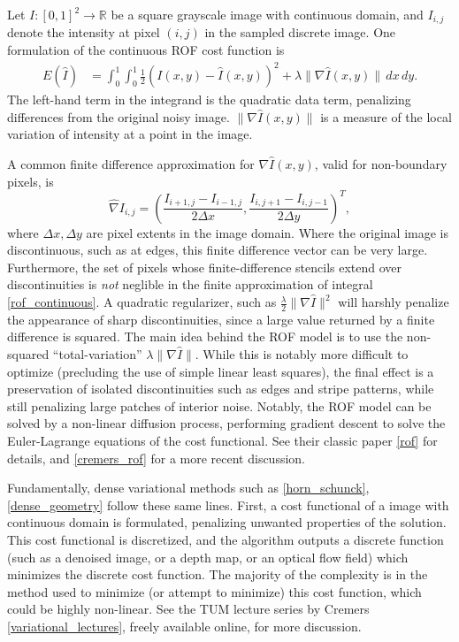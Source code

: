 \documentclass[conference]{IEEEtran}
\begin{document}
Let $I:[0,1]^2 \rightarrow \mathbb{R}$ be a square grayscale image with continuous domain, and
$I_{i,j}$ denote the intensity at pixel $(i, j)$ in the sampled discrete image.
One formulation of the continuous ROF cost function is
\begin{equation}\label{rof_continuous}
\begin{split}
    E(\hat{I}) &= \int_0^1\int_0^1 \frac{1}{2} \left(I(x,y) - \hat{I}(x,y)\right)^2 + \lambda \|\nabla \hat{I}(x,y)\| \,dx \,dy.
\end{split}
\end{equation}
The left-hand term in the integrand is the quadratic data term, penalizing differences from the original noisy image.
$\|\nabla \hat{I}(x,y)\|$ is a measure of the local variation of intensity at a point in the image.

A common finite difference approximation for $\nabla\hat{I}(x,y)$, valid for non-boundary pixels, is
\begin{equation}
    \hat{\nabla}I_{i,j} = \left(\frac{I_{i+1,j} - I_{i-1,j}}{2\Delta x}, \frac{I_{i,j+1} - I_{i,j-1}}{2\Delta y}\right)^T,
\end{equation}
where $\Delta x, \Delta y$ are pixel extents in the image domain. Where the original image is discontinuous, such as at edges,
this finite difference vector can be very large. Furthermore, the set of pixels whose finite-difference stencils extend over discontinuities is
\textit{not} neglible in the finite approximation of integral \eqref{rof_continuous}. A quadratic regularizer, such as
$\frac{\lambda}{2} \|\nabla \hat{I}\|^2$ will harshly penalize the appearance of sharp discontinuities, since a large value returned
by a finite difference is squared. The main idea behind the ROF model is to use the non-squared ``total-variation'' $\lambda \|\nabla \hat{I}\|$.
While this is notably more difficult to optimize (precluding the use of simple linear least squares), the final effect is a preservation
of isolated discontinuities such as edges and stripe patterns, while still penalizing large patches of interior noise. Notably, the ROF model can be solved by a non-linear diffusion process, performing gradient descent to solve the Euler-Lagrange
equations of the cost functional. See their classic paper \ref{rof} for details, and \ref{cremers_rof} for a more recent discussion.

Fundamentally, dense variational methods such as \eqref{horn_schunck}, \eqref{dense_geometry} follow these same lines. First,
a cost functional of a image with continuous domain is formulated, penalizing unwanted properties of the solution. This cost functional is discretized,
and the algorithm outputs a discrete function (such as a denoised image, or a depth map, or an optical flow field) which minimizes the discrete cost function.
The majority of the complexity is in the method used to minimize (or attempt to minimize) this cost function, which could be highly non-linear.
See the TUM lecture series by Cremers \ref{variational_lectures}, freely available online, for more discussion.
\end{document}
